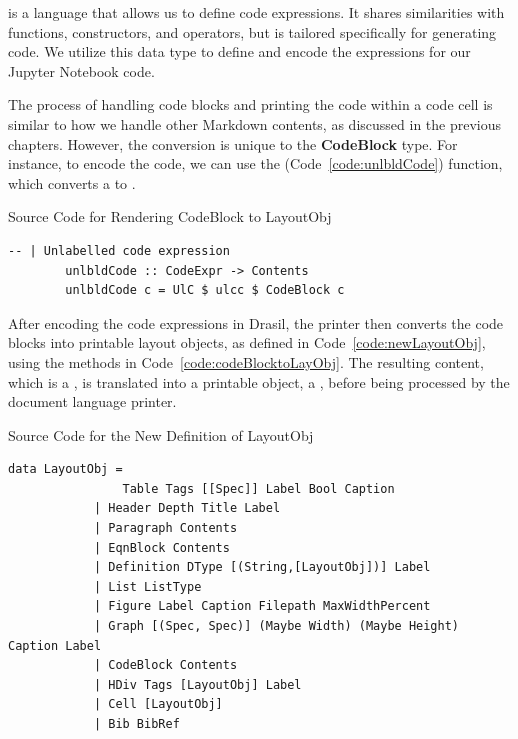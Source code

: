  is a language that allows us to define code expressions. It 
shares similarities with  functions, constructors, and operators, 
but is tailored specifically for generating code. We utilize this data type to 
define and encode the expressions for our Jupyter Notebook code. 

The process of handling code blocks and printing the code within a code cell 
is similar to how we handle other Markdown contents, as discussed in the 
previous chapters. However, the conversion is unique to the \textbf{CodeBlock} 
type. For instance, to encode the code, we can use the  
(Code~\ref{code:unlbldCode}) function, which converts a  to 
.

\begin{listing}[h!]
	\caption{Source Code for Rendering CodeBlock to LayoutObj}
	\label{code:unlbldCode}
	\begin{lstlisting}[language=haskell1]
		-- | Unlabelled code expression
		unlbldCode :: CodeExpr -> Contents
		unlbldCode c = UlC $ ulcc $ CodeBlock c
	\end{lstlisting}
\end{listing}

After encoding the code expressions in Drasil, the printer then converts the 
code blocks into printable layout objects, as defined in 
Code~\ref{code:newLayoutObj}, using the methods in 
Code~\ref{code:codeBlocktoLayObj}. The resulting content, which is a 
, is translated into a printable object, a 
, before being processed by the document language printer. 

\begin{listing}[h!]
	\caption{Source Code for the New Definition of LayoutObj}
	\label{code:newLayoutObj}
	\begin{lstlisting}[language=haskell1]
		data LayoutObj = 
				Table Tags [[Spec]] Label Bool Caption                          
			| Header Depth Title Label                                       
			| Paragraph Contents                                              
			| EqnBlock Contents                                               
			| Definition DType [(String,[LayoutObj])] Label                   
			| List ListType                                                   
			| Figure Label Caption Filepath MaxWidthPercent                  
			| Graph [(Spec, Spec)] (Maybe Width) (Maybe Height) Caption Label 
			| CodeBlock Contents  
			| HDiv Tags [LayoutObj] Label                                    
			| Cell [LayoutObj] 
			| Bib BibRef     
	\end{lstlisting}
\end{listing}

